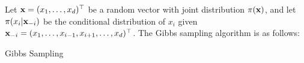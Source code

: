 Let \(\mathbf{x}=(x_{1},\ldots,x_{d})^{\top}\) be a random vector with joint distribution \(\pi(\mathbf{x})\), and let \(\pi(x_{i}|\mathbf{x}_{-i})\) be the conditional distribution of \(x_{i}\) given \(\mathbf{x}_{-i}=(x_{1},\ldots,x_{i-1},x_{i+1},\ldots,x_{d})^{\top}\). The Gibbs sampling algorithm is as follows:
\begin{algorithm}
	\caption{Gibbs Sampling}
\end{algorithm}
